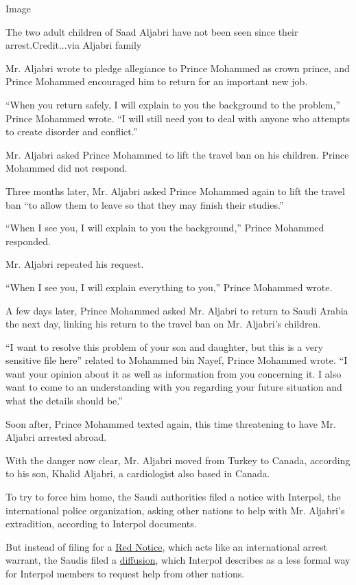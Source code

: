 Image

The two adult children of Saad Aljabri have not been seen since their
arrest.Credit...via Aljabri family

Mr. Aljabri wrote to pledge allegiance to Prince Mohammed as crown
prince, and Prince Mohammed encouraged him to return for an important
new job.

``When you return safely, I will explain to you the background to the
problem,'' Prince Mohammed wrote. ``I will still need you to deal with
anyone who attempts to create disorder and conflict.''

Mr. Aljabri asked Prince Mohammed to lift the travel ban on his
children. Prince Mohammed did not respond.

Three months later, Mr. Aljabri asked Prince Mohammed again to lift the
travel ban ``to allow them to leave so that they may finish their
studies.''

``When I see you, I will explain to you the background,'' Prince
Mohammed responded.

Mr. Aljabri repeated his request.

``When I see you, I will explain everything to you,'' Prince Mohammed
wrote.

A few days later, Prince Mohammed asked Mr. Aljabri to return to Saudi
Arabia the next day, linking his return to the travel ban on Mr.
Aljabri's children.

``I want to resolve this problem of your son and daughter, but this is a
very sensitive file here'' related to Mohammed bin Nayef, Prince
Mohammed wrote. ``I want your opinion about it as well as information
from you concerning it. I also want to come to an understanding with you
regarding your future situation and what the details should be.''

Soon after, Prince Mohammed texted again, this time threatening to have
Mr. Aljabri arrested abroad.

With the danger now clear, Mr. Aljabri moved from Turkey to Canada,
according to his son, Khalid Aljabri, a cardiologist also based in
Canada.

To try to force him home, the Saudi authorities filed a notice with
Interpol, the international police organization, asking other nations to
help with Mr. Aljabri's extradition, according to Interpol documents.

But instead of filing for a
\href{https://www.interpol.int/en/How-we-work/Notices/Red-Notices}{Red
Notice}, which acts like an international arrest warrant, the Saudis
filed a
\href{https://www.interpol.int/en/How-we-work/Notices/About-Notices}{diffusion},
which Interpol describes as a less formal way for Interpol members to
request help from other nations.

